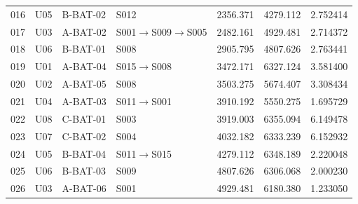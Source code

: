 \documentclass[a4paper]{my_paper}%
\numberwithin{equation}{section}
\newcommand{\srcnote}[1]{\par\vspace{2pt}{\footnotesize\raggedright #1\par}}
\theoremstyle{definition}
\begin{document}
\begin{longtable}{@{}rllP{.27\linewidth}rrr@{}}
016 & U05 & B-BAT-02 & S012 & 2356.371 & 4279.112 & 2.752414\\
017 & U03 & A-BAT-02 & S001$\to$S009$\to$S005 & 2482.161 & 4929.481 & 2.714372\\
018 & U06 & B-BAT-01 & S008 & 2905.795 & 4807.626 & 2.763441\\
019 & U01 & A-BAT-04 & S015$\to$S008 & 3472.171 & 6327.124 & 3.581400\\
020 & U02 & A-BAT-05 & S008 & 3503.275 & 5674.407 & 3.308434\\
021 & U04 & A-BAT-03 & S011$\to$S001 & 3910.192 & 5550.275 & 1.695729\\
022 & U08 & C-BAT-01 & S003 & 3919.003 & 6355.094 & 6.149478\\
023 & U07 & C-BAT-02 & S004 & 4032.182 & 6333.239 & 6.152932\\
024 & U05 & B-BAT-04 & S011$\to$S015 & 4279.112 & 6348.189 & 2.220048\\
025 & U06 & B-BAT-03 & S009 & 4807.626 & 6306.068 & 2.000230\\
026 & U03 & A-BAT-06 & S001 & 4929.481 & 6180.380 & 1.233050\\
\end{longtable}
\srcnote{架次前缀为Q2-。各路线前后均连接O01；单位统一为秒和kWh。}
\endgroup
\end{document}
